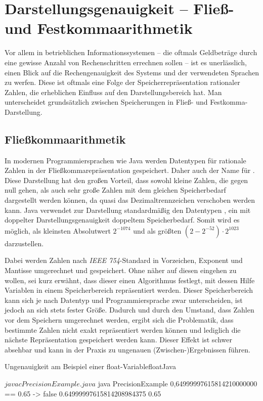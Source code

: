 \section{Darstellungsgenauigkeit -- Fließ- und Festkommaarithmetik}
Vor allem in betrieblichen Informationssystemen -- die oftmals Geldbeträge durch eine gewisse Anzahl von Rechenschritten errechnen sollen -- ist es unerlässlich, einen Blick auf die Rechengenauigkeit des Systems und der verwendeten Sprachen zu werfen. Diese ist oftmals eine Folge der Speicherrepräsentation rationaler Zahlen, die erheblichen Einfluss auf den Darstellungsbereich hat. Man unterscheidet grundsätzlich zwischen Speicherungen in Fließ- und Festkomma-Darstellung.
 
\subsection*{Fließkommaarithmetik}
In modernen Programmiersprachen wie Java werden Datentypen für rationale Zahlen in der Fließkommarepräsentation gespeichert. Daher auch der Name  für \engl {}. Diese Darstellung hat den großen Vorteil, dass sowohl kleine Zahlen, die gegen null gehen, als auch sehr große Zahlen mit dem gleichen Speicherbedarf dargestellt werden können, da quasi das Dezimaltrennzeichen verschoben werden kann. Java verwendet zur Darstellung standardmäßig den Datentypen , ein  mit doppelter Darstellungsgenauigkeit \bzw doppeltem Speicherbedarf. Somit wird es möglich, als kleinsten Absolutwert $2^{-1074}$ und als größten $(2 - 2^{-52}) \cdot 2^{1023}$ darzustellen.

Dabei werden Zahlen nach \textit{IEEE 754}-Standard in Vorzeichen, Exponent und Mantisse umgerechnet und gespeichert. Ohne näher auf diesen eingehen zu wollen, sei kurz erwähnt, dass dieser einen Algorithmus festlegt, mit dessen Hilfe Variablen in einem Speicherbereich repräsentiert werden. Dieser Speicherbereich kann sich je nach Datentyp und Programmiersprache zwar unterscheiden, ist jedoch an sich stets fester Größe. Dadurch und durch den Umstand, dass Zahlen vor dem Speichern umgerechnet werden, ergibt sich die Problematik, dass bestimmte Zahlen nicht exakt repräsentiert werden können und lediglich die nächste Repräsentation gespeichert werden kann. Dieser Effekt ist schwer absehbar und kann in der Praxis zu ungenauen (Zwischen-)Ergebnissen führen.

\begin{codeWithCaption}{Ungenauigkeit am Beispiel einer float-Variable}{floatJava}
    \begin{shellwindow}
    $ javac PrecisionExample.java 
    $ java PrecisionExample
    0,64999997615814210000000 == 0.65 -> false
    0.64999997615814208984375
    0.65
    \end{shellwindow}
\end{codeWithCaption}

